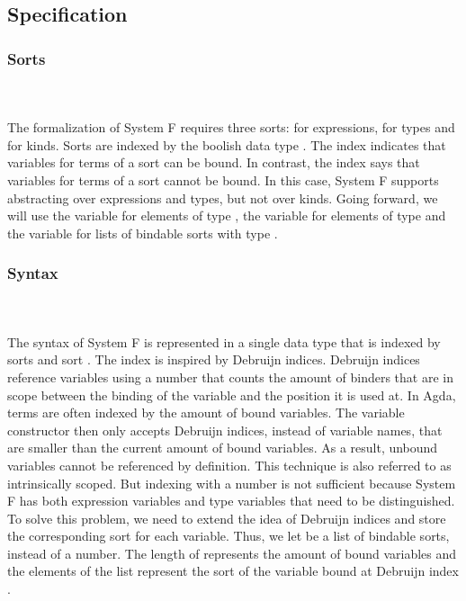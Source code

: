 \subsection{Specification}
\subsubsection{Sorts}\hfill\\\\
The formalization of System F requires three sorts:  for expressions,  for types and  for kinds. 
\FSort
Sorts are indexed by the boolish data type . 
The index  indicates that variables for terms of a sort can be bound. 
In contrast, the index  says that variables for terms of a sort cannot be bound. 
In this case, System F supports abstracting over expressions and types, but not over kinds. 
Going forward, we will use the variable  for elements of type , the variable  for elements of type  and the variable  for lists of bindable sorts with type \FSorts.

\subsubsection{Syntax}\hfill\\\\
The syntax of System F is represented in a single data type  that is indexed by sorts  and sort . 
The index  is inspired by Debruijn indices. 
Debruijn indices reference variables using a number that counts the amount of binders that are in scope between the binding of the variable and the position it is used at. 
In Agda, terms are often indexed by the amount of bound variables. 
The variable constructor then only accepts Debruijn indices, instead of variable names, that are smaller than the current amount of bound variables.
As a result, unbound variables cannot be referenced by definition. 
This technique is also referred to as intrinsically scoped.
But indexing  with a number is not sufficient because System F has both expression variables and type variables that need to be distinguished. 
To solve this problem, we need to extend the idea of Debruijn indices and store the corresponding sort for each variable. Thus, we let  be a list of bindable sorts, instead of a number.
The length of  represents the amount of bound variables and the elements  of the list represent the sort of the variable bound at Debruijn index . 

